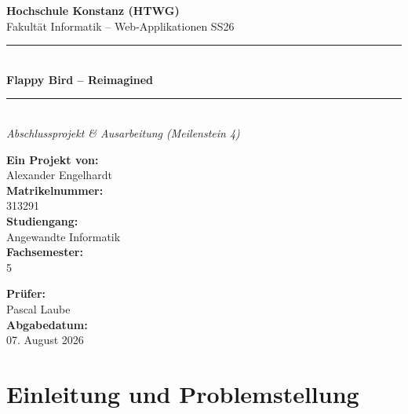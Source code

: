 \documentclass[12pt,a4paper]{article}
\begin{document}
\begin{titlepage}
  \begin{center}
    \vspace*{0.5cm}
    {\LARGE\bfseries Hochschule Konstanz (HTWG)}\\[0.3cm]
    {\large Fakultät Informatik -- Web-Applikationen SS26}\\[1.5cm]

    \rule{\linewidth}{0.5mm}\\[0.4cm]
    {\LARGE\bfseries Flappy Bird -- Reimagined}\\[0.2cm]
    \rule{\linewidth}{0.5mm}\\[1.2cm]

    {\Large\itshape Abschlussprojekt \& Ausarbeitung (Meilenstein 4)}\\[2.5cm]
  \end{center}

  \vfill

  \noindent
  \begin{minipage}[t]{0.48\textwidth}
    {\large\bfseries Ein Projekt von:}\\
    Alexander Engelhardt\\[1em]
    {\large\bfseries Matrikelnummer:}\\
    313291\\[1em]
    {\large\bfseries Studiengang:}\\
    Angewandte Informatik\\[1em]
    {\large\bfseries Fachsemester:}\\
    5
  \end{minipage}
  \hfill
  \begin{minipage}[t]{0.48\textwidth}\raggedleft
    {\large\bfseries Prüfer:}\\
    Pascal Laube\\[2em]
    {\large\bfseries Abgabedatum:}\\
    07. August 2026
  \end{minipage}

  \vspace*{0.5cm}
  \end{titlepage}

\newpage
{}
\tableofcontents
\newpage
\listoftables
\listoffigures
\lstlistoflistings
\newpage
{}

\section{Einleitung und Problemstellung}
\end{document}
